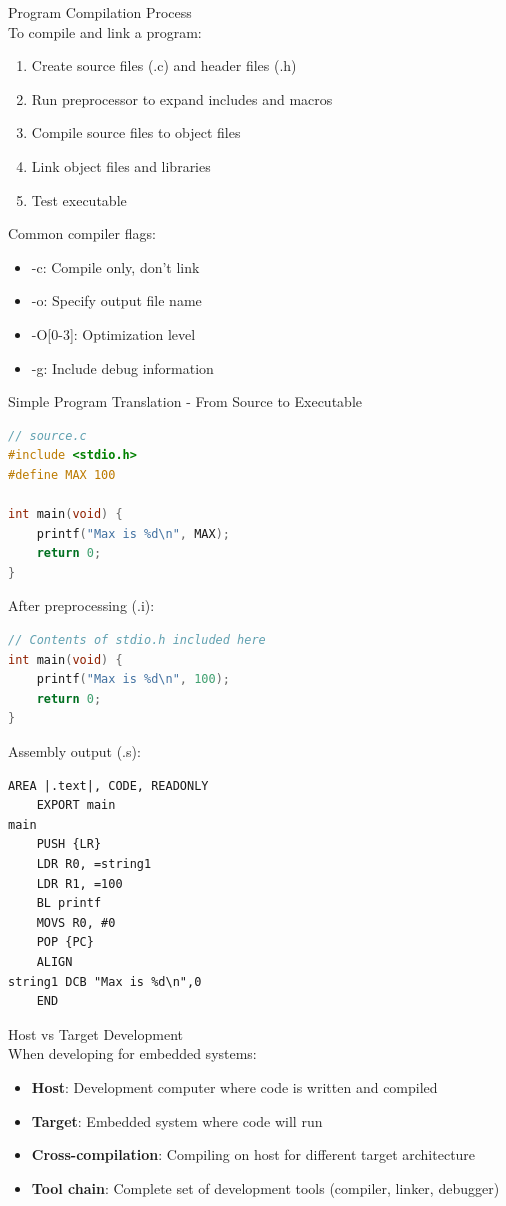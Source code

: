 \begin{KR}{Program Compilation Process}\\
To compile and link a program:
\begin{enumerate}
  \item Create source files (.c) and header files (.h)
  \item Run preprocessor to expand includes and macros
  \item Compile source files to object files
  \item Link object files and libraries
  \item Test executable
\end{enumerate}

Common compiler flags:
\begin{itemize}
  \item -c: Compile only, don't link
  \item -o: Specify output file name
  \item -O[0-3]: Optimization level
  \item -g: Include debug information
\end{itemize}
\end{KR}

\begin{code}{Simple Program Translation - From Source to Executable}
\begin{lstlisting}[language=C, style=basesmol]
// source.c
#include <stdio.h>
#define MAX 100

int main(void) {
    printf("Max is %d\n", MAX);
    return 0;
}
\end{lstlisting}

After preprocessing (.i):
\begin{lstlisting}[language=C, style=basesmol]
// Contents of stdio.h included here
int main(void) {
    printf("Max is %d\n", 100);
    return 0;
}
\end{lstlisting}

Assembly output (.s):
\begin{lstlisting}[language=armasm, style=basesmol]
    AREA |.text|, CODE, READONLY
    EXPORT main
main
    PUSH {LR}
    LDR R0, =string1
    LDR R1, =100
    BL printf
    MOVS R0, #0
    POP {PC}
    ALIGN
string1 DCB "Max is %d\n",0
    END
\end{lstlisting}
\end{code}

\begin{example2}{Host vs Target Development}\\
When developing for embedded systems:
\begin{itemize}
  \item \textbf{Host}: Development computer where code is written and compiled
  \item \textbf{Target}: Embedded system where code will run
  \item \textbf{Cross-compilation}: Compiling on host for different target architecture
  \item \textbf{Tool chain}: Complete set of development tools (compiler, linker, debugger)
\end{itemize}
\end{example2}

